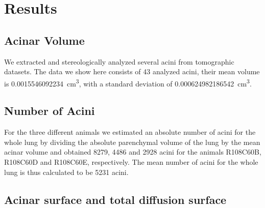 \documentclass[twoside,paper=a4,abstract=true,english,DIV=calc]{scrartcl}
\newcommand{\numberofacini}{43}
\newcommand{\meanacinarvolume}{0.0015546092234} %
\newcommand{\std}{0.000624982186542} %
\begin{document}
\section{Results}
\label{sec:results}
\subsection{Acinar Volume}
We extracted and stereologically analyzed several acini from tomographic datasets. The data we show here consists of \numberofacini\xspace analyzed acini, their mean volume is \SI{\meanacinarvolume}{\centi\metre\cubed}, with a standard deviation of \SI{\std}{\centi\metre\cubed}.

\subsection{Number of Acini}

For the three different animals we estimated an absolute number of acini for the whole lung by dividing the absolute parenchymal volume of the lung by the mean acinar volume and obtained 8279, 4486 and 2928 acini for the animals R108C60B, R108C60D and R108C60E, respectively. The mean number of acini for the whole lung is thus calculated to be 5231 acini. 

\subsection{Acinar surface and total diffusion surface}
\end{document}
